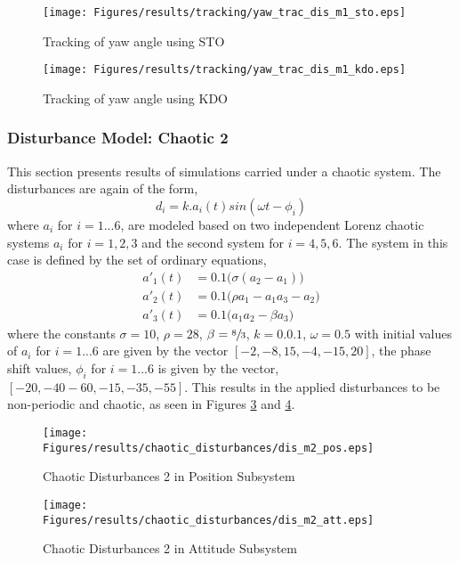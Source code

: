\documentclass{article}
\begin{document}
\begin{figure}[H]
\centering
\texttt{[image: Figures/results/tracking/yaw\_trac\_dis\_m1\_sto.eps]}
\caption{Tracking of yaw angle using STO}
\label{yaw_trac_dis_m1_sto}
\end{figure}

\begin{figure}[H]
\centering
\texttt{[image: Figures/results/tracking/yaw\_trac\_dis\_m1\_kdo.eps]}
\caption{Tracking of yaw angle using KDO}
\label{yaw_trac_dis_m1_kdo}
\end{figure}

\subsubsection{Disturbance Model: Chaotic 2}
This section presents results of simulations carried under a chaotic system. The disturbances are again of the form,
\begin{equation}
d_i = k.a_i(t)sin(\omega t-\phi_i)
\label{eq:dist_2}
\end{equation}
where $a_i$ for $i=1...6$, are modeled based on two independent Lorenz chaotic systems $a_i$ for $i=1,2,3$ and the second system for $i=4,5,6$. The system in this case is defined by the set of ordinary equations, 
\begin{subequations}
\begin{align}
a'_1(t) &= 0.1\big(\sigma(a_2-a_1)\big)\\
a'_2(t) &= 0.1\big(\rho a_1 - a_1 a_3 - a_2\big)\\
a'_3(t) &= 0.1\big(a_1 a_2 - \beta a_3\big)
\end{align}
\end{subequations}
where the constants $\sigma=10$, $\rho=28$, $\beta=\sfrac{8}{3}$, $k=0.0.1$, $\omega=0.5$ with initial values of $a_i$ for $i=1...6$ are given by the vector $[-2,-8,15,-4,-15,20]$, the phase shift values, $\phi_i$ for $i=1...6$ is given by the vector, $[-20,-40-60,-15,-35,-55]$. This results in the applied disturbances to be non-periodic and chaotic, as seen in Figures \ref{dis_m2_pos} and \ref{dis_m2_att}.

\begin{figure}[H]
\centering
\texttt{[image: Figures/results/chaotic\_disturbances/dis\_m2\_pos.eps]}
\caption{Chaotic Disturbances 2 in Position Subsystem}
\label{dis_m2_pos}
\end{figure}

\begin{figure}[H]
\centering
\texttt{[image: Figures/results/chaotic\_disturbances/dis\_m2\_att.eps]}
\caption{Chaotic Disturbances 2 in Attitude Subsystem}
\label{dis_m2_att}
\end{figure}
\end{document}
